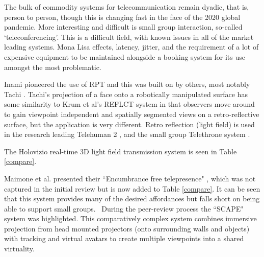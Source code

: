 The bulk of commodity systems for telecommunication remain dyadic, that is, person to person, though this is changing fast in the face of the 2020 global pandemic. More interesting and difficult is small group interaction, so-called `teleconferencing'. This is a difficult field, with known issues in all of the market leading systems. Mona Lisa effects, latency, jitter, and the requirement of a lot of expensive equipment to be maintained alongside a booking system for its use amongst the most problematic.\par
Inami pioneered the use of RPT \cite{inami2000visuo} and this was built on by others, most notably Tachi \cite{Tachi2003, Tachi2004}. Tachi's projection of a face onto a robotically manipulated surface has some similarity to Krum et al's REFLCT system \cite{Krum2012} in that observers move around to gain viewpoint independent and spatially segmented views on a retro-reflective surface, but the application is very different. Retro reflection (light field) is used in the research leading Telehuman 2 \cite{gotsch2018telehuman2}, and the small group Telethrone system \cite{o2018telethrone}. \par

The Holovizio real-time 3D light field transmission system\cite{3dlightfield} is seen in Table \ref{compare}.\par
Maimone et al. presented their ``Encumbrance free telepresence" \cite{6162881}, which was not captured in the initial review but is now added to Table \ref{compare}. It can be seen that this system provides many of the desired affordances but falls short on being able to support small groups. \
During the peer-review process the ``SCAPE" system \cite{1255811} was highlighted. This comparatively complex system combines immersive projection from head mounted projectors (onto surrounding walls and objects) with tracking and virtual avatars to create multiple viewpoints into a shared virtuality.


